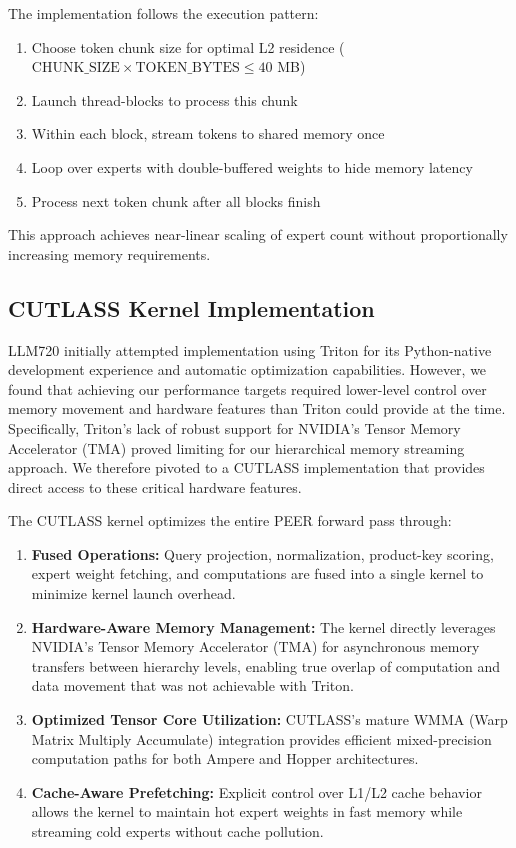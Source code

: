 \documentclass[11pt]{article}
\begin{document}
The implementation follows the execution pattern:
\begin{enumerate}
    \item Choose token chunk size for optimal L2 residence ($\text{CHUNK\_SIZE} \times \text{TOKEN\_BYTES} \leq 40$ MB)
    \item Launch thread-blocks to process this chunk
    \item Within each block, stream tokens to shared memory once
    \item Loop over experts with double-buffered weights to hide memory latency
    \item Process next token chunk after all blocks finish
\end{enumerate}

This approach achieves near-linear scaling of expert count without proportionally increasing memory requirements.

\subsection{CUTLASS Kernel Implementation}

LLM720 initially attempted implementation using Triton for its Python-native development experience and automatic optimization capabilities. However, we found that achieving our performance targets required lower-level control over memory movement and hardware features than Triton could provide at the time. Specifically, Triton's lack of robust support for NVIDIA's Tensor Memory Accelerator (TMA) proved limiting for our hierarchical memory streaming approach. We therefore pivoted to a CUTLASS implementation that provides direct access to these critical hardware features.

The CUTLASS kernel optimizes the entire PEER forward pass through:

\begin{enumerate}
    \item \textbf{Fused Operations:} Query projection, normalization, product-key scoring, expert weight fetching, and computations are fused into a single kernel to minimize kernel launch overhead.
    
    \item \textbf{Hardware-Aware Memory Management:} The kernel directly leverages NVIDIA's Tensor Memory Accelerator (TMA) for asynchronous memory transfers between hierarchy levels, enabling true overlap of computation and data movement that was not achievable with Triton.
    
    \item \textbf{Optimized Tensor Core Utilization:} CUTLASS's mature WMMA (Warp Matrix Multiply Accumulate) integration provides efficient mixed-precision computation paths for both Ampere and Hopper architectures.
    
    \item \textbf{Cache-Aware Prefetching:} Explicit control over L1/L2 cache behavior allows the kernel to maintain hot expert weights in fast memory while streaming cold experts without cache pollution.
\end{enumerate}
\end{document}
